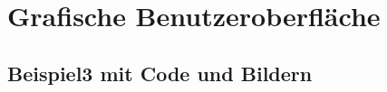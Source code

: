 \chapter{Grafische Benutzeroberfläche}

\section{Beispiel3 mit Code und Bildern}
\label{sec:beispiel3}
